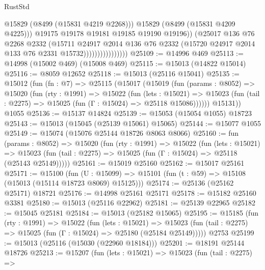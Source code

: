 \begin{lexlean}{RustStd}
\begin{coremodule}
                                      @15829
                                      (@8499 (@15831 @4219 @2268)))
                                    @15829
                                    (@8499 (@15831 @4209 @4225)))
                                  @19175
                                  @19178
                                  @19181
                                  @19185
                                  @19190
                                  @19196))
                              (@25017
                                @136
                                @76
                                @2268
                                @2332
                                (@15711
                                  @24917
                                  @2014
                                  @136
                                  @76
                                  @2332
                                  (@15720 @24917 @2014 @133 @76 @2331 @15732))))))))))))))))
@25109 := @14996 @469
@25113 := @14998 (@15002 @469) (@15008 @469)
@25115 := @15013 (@14822 @15014)
@25116 := @8059 @12652
@25118 := @15013 (@25116 @15041)
@25135 := @15012
    (fun (fn : @7) =>
    @25115
      (@15017
        (@15019
          (fun (params : @8052) =>
          @15020
            (fun (rty : @1991) =>
            @15022
              (fun (lets : @15021) =>
              @15023 (fun (tail : @2275) => @15025 (fun (Γ : @15024) => @25118 @15086))))))
        @15131))
    @1055
@25136 := @15137 @14824
@25139 := @15053 (@15054 @1055) @18723
@25143 := @15013 (@15045 (@25139 @15061) @15065)
@25144 := @15077 @1055
@25149 := @15074 (@15076 @25144 @18726 @8063 @8066)
@25160 := fun (params : @8052) =>
  @15020
    (fun (rty : @1991) =>
    @15022
      (fun (lets : @15021) =>
      @15023 (fun (tail : @2275) => @15025 (fun (Γ : @15024) => @25118 (@25143 @25149)))))
@25161 := @15019 @25160
@25162 := @15017 @25161
@25171 := @15100
    (fun (U : @15099) => @15101 (fun (t : @59) => @15108 (@15013 (@15114 @18723 @8069) @15125)))
@25174 := @25136 (@25162 @25171) @18721
@25176 := @14998 @25161 @25171
@25178 := @15182 @25160 @3381
@25180 := @15013 (@25116 @22962)
@25181 := @25139 @22965
@25182 := @15045 @25181
@25184 := @15013 (@25182 @15065)
@25195 := @15185
    (fun (rty : @1991) =>
    @15022
      (fun (lets : @15021) =>
      @15023 (fun (tail : @2275) => @15025 (fun (Γ : @15024) => @25180 (@25184 @25149)))))
    @2753
@25199 := @15013 (@25116 (@15030 (@22960 @18184)))
@25201 := @18191 @25144 @18726
@25213 := @15207
    (fun (lets : @15021) =>
    @15023
      (fun (tail : @2275) =>

\end{coremodule}
\end{lexlean}
